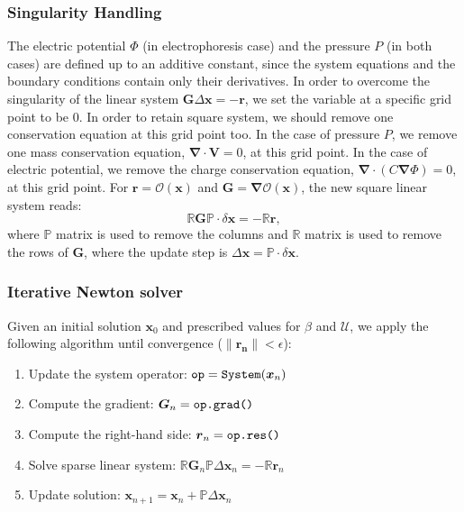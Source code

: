 \documentclass[10pt]{ijnam}
\newcommand\eps \epsilon
\newcommand{\pars}[1]{\left(#1\right)}
\newcommand\bnabla{\boldsymbol{\nabla}}
\newcommand\bV{\boldsymbol{V}}
\newcommand\bG{\boldsymbol{G}}
\newcommand\bx{\boldsymbol{x}}
\newcommand\br{\boldsymbol{r}}
\newcommand\cO{\mathcal{O}}
\newcommand\cU{\mathscr{U}}
\begin{document}
\subsubsection{Singularity Handling} \label{sec:singular}
The electric potential $\varPhi$ (in electrophoresis case) and the pressure $P$ (in both cases) 
are defined up to an additive constant, since the system equations and the boundary conditions
contain only their derivatives.
In order to overcome the singularity of the linear system 
$\bG \Delta\bx = -\br$, we set the variable at 
a specific grid point to be $0$.
In order to retain square system, we should remove one conservation equation at this grid point too.
In the case of pressure $P$, we remove one mass conservation equation,
$\bnabla \cdot \bV = 0$, at this grid point. 
In the case of electric potential, we remove the charge conservation
equation, $\bnabla \cdot \pars{C \bnabla \varPhi} = 0$, at this grid point.
For $\br = \cO(\bx)$ and $\bG = \bnabla \cO(\bx)$, the new square linear system reads:
\begin{equation}
\mathbb{R} \bG \mathbb{P} \cdot \delta\bx = -\mathbb{R} \br,
\end{equation}
where $\mathbb{P}$ matrix is used to remove the columns
and $\mathbb{R}$ matrix is used to remove the rows of $\bG$,
where the update step is $\Delta \bx = \mathbb{P} \cdot \delta \bx$.

\subsubsection{Iterative Newton solver}
Given an initial solution $\bx_0$ and prescribed values for $\beta$ and $\cU$, 
we apply the following algorithm 
until convergence ($\|\boldsymbol{r_n}\| < \eps$):
\begin{enumerate}
\item Update the system operator: $\verb|op| = \verb|System|(\bx_{n})$
\item Compute the gradient: $\boldsymbol{G}_n = \verb|op.grad()|$
\item Compute the right-hand side: $\boldsymbol{r}_n = \verb|op.res()|$
\item Solve sparse linear system: $\mathbb{R}\boldsymbol{G}_n \mathbb{P} \Delta \bx_n = -\mathbb{R}\boldsymbol{r}_n$
\item Update solution: $\bx_{n+1} = \bx_{n} + \mathbb{P}\Delta \bx_{n}$
\end{enumerate}

\end{document}
